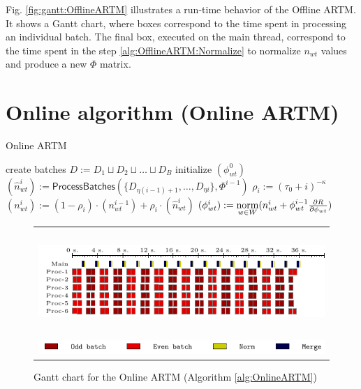 \documentclass[russian,english]{llncs}
\newcommand{\norm}{\mathop{\rm norm}\limits}
\newcommand{\kw}[1]{\textsf{#1}}
\begin{document}
Fig. \ref{fig:gantt:OfflineARTM} illustrates a run-time behavior of the \kw{Offline ARTM}.
It shows a Gantt chart, where boxes correspond to the time spent in processing an individual batch.
The final box, executed on the main thread, correspond to the time spent in the step \ref{alg:OfflineARTM:Normalize}
to normalize $n_{wt}$ values and produce a new $\Phi$ matrix.

\section{Online algorithm (\kw{Online ARTM})}
\label{sec:OnlineARTM}

\SetAlgoSkip{}
\begin{algorithm2e}[t]
	\caption{Online ARTM} %
	\label{alg:OnlineARTM}
	\BlankLine
	\BlankLine
	create batches $D := D_1 \sqcup D_2 \sqcup \dots \sqcup D_B$\;
	initialize $(\phi^0_{wt})$\;
	 {
		$(\hat n^i_{wt}) := \kw{ProcessBatches}(\{D_{\eta (i - 1) + 1}, \dots, D_{\eta i}\}, \Phi^{i - 1})$\;
		$\rho_i := (\tau_0 + i)^{-\kappa}$\;
		\label{alg:OnlineARTM:Rho}
		$(n^{i}_{wt}) := (1 - \rho_i) \cdot (n^{i-1}_{wt}) + \rho_i \cdot (\hat n^{i}_{wt})$\;
		\label{alg:OnlineARTM:Merge}
		$(\phi^{i}_{wt}) := \norm_{w \in W} (n^{i}_{wt} + \phi^{i - 1}_{wt} \frac{\partial R}{\partial \phi_{wt}})$\;
		\label{alg:OnlineARTM:Normalize}
	}
\end{algorithm2e}
\begin{figure}[t!]
	\centering
	\begin{tabular}{c}
		\includegraphics[height=4cm, width=12cm]{plots/online.pdf} \\
		\includegraphics[scale=1]{plots/legend_online.pdf}
	\end{tabular}
	\caption{Gantt chart for the \kw{Online ARTM} (Algorithm \ref{alg:OnlineARTM})} \label{fig:gantt:OnlineARTM}
\end{figure}
\end{document}
